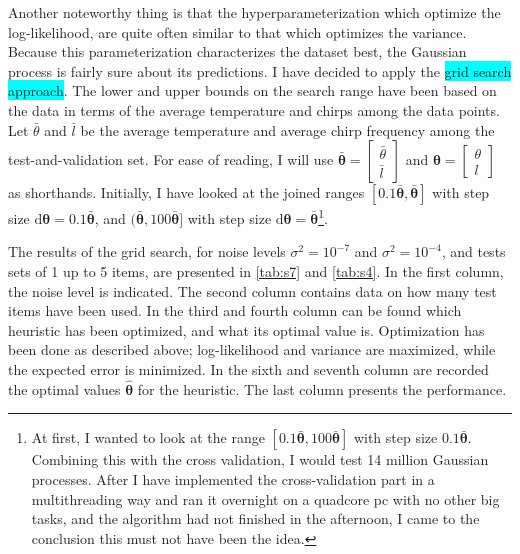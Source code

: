 \documentclass[a4paper,11pt]{article}
\newcommand{\V}[1]{\ensuremath{\boldsymbol{#1}}}
\newcommand{\dif}{\ensuremath{\mathrm{d}}}
\newcommand{\hl}[1]{\colorbox{cyan}{#1}}
\begin{document}
Another noteworthy thing is that the hyperparameterization which optimize the log-likelihood, are quite often similar to that which optimizes the variance.  Because this parameterization characterizes the dataset best, the Gaussian process is fairly sure about its predictions. 
I have decided to apply the \hl{grid search approach}.  The lower and upper bounds on the search range have been based on the data in terms of the average temperature and chirps among the data points.  Let $\bar\theta$ and $\bar l$ be the average temperature and average chirp frequency among the test-and-validation set.  For ease of reading, I will use $\V{\bar\theta} = \begin{bmatrix}\bar\theta\\\bar l\end{bmatrix}$ and $\V{\theta} = \begin{bmatrix}\theta\\l\end{bmatrix}$ as shorthands.  Initially, I have looked at the joined ranges $[0.1\V{\bar\theta}, \V{\bar\theta}]$ with step size $\dif \V{\theta} = 0.1\V{\bar\theta}$, and $(\V{\bar\theta}, 100 \V{\bar\theta}]$ with step size $\dif \V{\theta} = \V{\bar\theta}$\footnote{At first, I wanted to look at the range $[0.1\V{\bar\theta}, 100\V{\bar\theta}]$ with step size $0.1\V{\bar\theta}$. Combining this with the cross validation, I would test 14 million Gaussian processes.  After I have implemented the cross-validation part in a multithreading way and ran it overnight on a quadcore pc with no other big tasks, and the algorithm had not finished in the afternoon, I came to the conclusion this must not have been the idea.}.  %

The results of the grid search, for noise levels $\sigma^2 = 10^{-7}$ and $\sigma^2 = 10^{-4}$, and tests sets of 1 up to 5 items, are presented in \autoref{tab:s7} and \autoref{tab:s4}.  In the first column, the noise level is indicated.  The second column contains data on how many test items have been used.  In the third and fourth column can be found which heuristic has been optimized, and what its optimal value is.  Optimization has been done as described above; log-likelihood and variance are maximized, while the expected error is minimized.  In the sixth and seventh column are recorded the optimal values $\V{\hat\theta}$ for the heuristic.  The last column presents the performance.
\end{document}

